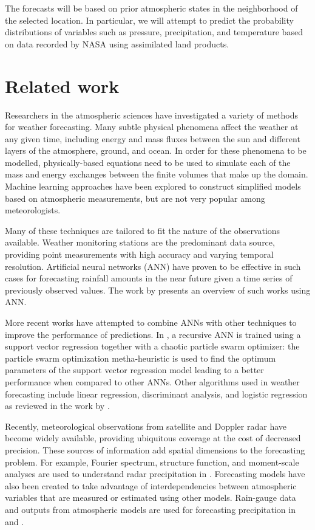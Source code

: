 \documentclass{article}
\begin{document}
The forecasts will be based on prior atmospheric states in the neighborhood of
the selected location. In particular, we will attempt to predict the probability
distributions of variables such as pressure, precipitation, and temperature
based on data recorded by NASA using assimilated land products.

\section{Related work} 
 
Researchers in the atmospheric sciences have investigated a variety of methods
for weather forecasting. Many subtle physical phenomena affect the weather at
any given time, including energy and mass fluxes between the sun and different
layers of the atmosphere, ground, and ocean. In order for these phenomena
to be modelled, physically-based equations need to be used to simulate each of
the mass and energy exchanges between the finite volumes that make up the
domain. Machine learning approaches have been explored to construct simplified
models based on atmospheric measurements, but are not very popular among
meteorologists.

Many of these techniques are tailored to fit the nature of the observations
available. Weather monitoring stations are the predominant data source,
providing point measurements with high accuracy and varying temporal resolution.
Artificial neural networks (ANN) have proven to be effective in such cases for
forecasting rainfall amounts in the near future given a time series of
previously observed values. The work by \citet{maier2000} presents an overview
of such works using ANN. 

More recent works have attempted to combine ANNs with other techniques to
improve the performance of predictions. In \cite{hong2008}, a recursive ANN is
trained using a support vector regression together with a chaotic particle swarm
optimizer: the particle swarm optimization metha-heuristic is used to find the
optimum parameters of the support vector regression model leading to a better
performance when compared to other ANNs. Other algorithms used in weather
forecasting include linear regression, discriminant analysis, and logistic
regression as reviewed in the work by \citet{applequist2002}.

Recently, meteorological observations from satellite and Doppler radar have
become widely available, providing ubiquitous coverage at the cost of decreased
precision. These sources of information add spatial dimensions to the
forecasting problem. For example, Fourier spectrum, structure function, and
moment-scale analyses are used to understand radar precipitation in
\cite{harris2007}. Forecasting models have also been created to take advantage
of interdependencies between atmospheric variables that are measured or
estimated using other models. Rain-gauge data and outputs from atmospheric
models are used for forecasting precipitation in \cite{kuligowski1998} and
\cite{ramirez2005}.
\end{document}
